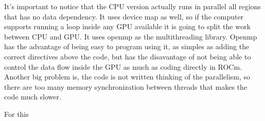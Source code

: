 It's important to notice that the CPU version actually runs in parallel all
regions that has no data dependency. It uses device map as well, so if the computer
supports running a loop inside any GPU available it is going to split the work between CPU and GPU.
It uses openmp as the multithreading library. Openmp has the advantage of being easy
to program using it, as simples as adding the correct directives above the code, but
has the disavantage of not being able to control the data flow inside the GPU as much
as coding directly in ROCm. Another big problem is, the code is not written thinking
of the parallelism, so there are too many memory synchronization between threads
that makes the code much slower.

For this

